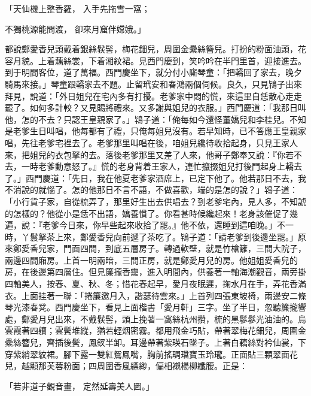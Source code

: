 \begin{showcontents}{}
「天仙機上整香羅，  入手先拖雪一窩；

不獨桃源能問渡，  卻來月窟伴嫦娥。」

都說鄭愛香兒頭戴着銀絲䯼髻，梅花鈿兒，周圍金纍絲簪兒。打扮的粉面油頭，花容月貌。上着藕絲裳，下着湘紋裙。見西門慶到，笑吟吟在半門里首，迎接進去。到于明間客位，道了萬福。西門慶坐下，就分付小廝琴童：「把轎回了家去，晚夕騎馬來接。」琴童跟轎家去不題。止留玳安和春鴻兩個伺候。良久，只見鴇子出來拜見，說道：「外日姐兒在宅內多有打擾。老爹家中悶的慌，來這里自恁散心走走罷了。如何多計較？又見賜將禮來。又多謝與姐兒的衣服。」西門慶道：「我那日叫他，怎的不去？只認王皇親家了。」鴇子道：「俺每如今還怪董嬌兒和李桂兒。不知是老爹生日叫唱，他每都有了禮，只俺每姐兒沒有。若早知時，已不答應王皇親家唱，先往老爹宅裡去了。老爹那里叫唱在後，咱姐兒纔待收拾起身，只見王家人來，把姐兒的衣包拏的去。落後老爹那里又差了人來，他哥子鄭奉又說：『你若不去，一時老爹動意怒了。』慌的老身背着王家人，連忙攛掇姐兒打後門起身上轎去了。」西門慶道：「先日，我在他夏老爹家酒席上，已定下他了。他若那日不去，我不消說的就惱了。怎的他那日不言不語，不做喜歡，端的是怎的說？」鴇子道：「小行貨子家，自從梳弄了，那里好生出去供唱去？到老爹宅內，見人多，不知諕的怎樣的？他從小是恁不出語，嬌養慣了。你看甚時候纔起來！老身該催促了幾遍，說：『老爹今日來，你早些起來收拾了罷。』他不依，還睡到這咱晚。」不一時，丫鬟拏茶上來，鄭愛香兒向前遞了茶吃了。鴇子道：「請老爹到後邊坐罷。」原來鄭愛香兒家，門面四間，到底五層房子。轉過軟壁，就是竹槍籬，三間大院子，兩邊四間廂房。上首一明兩暗，三間正房，就是鄭愛月兒的房。他姐姐愛香兒的房，在後邊第四層住。但見簾攏香靄，進入明間內，供養著一軸海潮觀音，兩旁掛四軸美人，按春、夏、秋、冬；惜花春起早，愛月夜眠遲，掬水月在手，弄花香滿衣。上面挂著一聯：「捲簾邀月入，諧瑟待雲來。」上首列四張東坡椅，兩邊安二條琴光漆春凳。西門慶坐下，看見上面楷書「愛月軒」三字。坐了半日，忽聽簾攏響處，鄭愛月兒出來，不戴䯼髻，頭上挽著一窩絲杭州攢，梳的黑鬖鬖光油油的。烏雲霞著四軉；雲鬢堆縱，猶若輕烟密霧。都用飛金巧貼，帶著翠梅花鈿兒，周圍金纍絲簪兒，齊插後鬢，鳳釵半卸。耳邊帶著紫瑛石墜子。上著白藕絲對衿仙裳，下穿紫綃翠紋裙。腳下露一雙紅鴛鳳嘴，胸前搖琱璫寶玉玲瓏。正面貼三顆翠面花兒，越顯那芙蓉粉面；四周圍香風縹緲，偏相襯楊柳纖腰。正是：

「若非道子觀音畫，  定然延壽美人圖。」


\end{showcontents}
